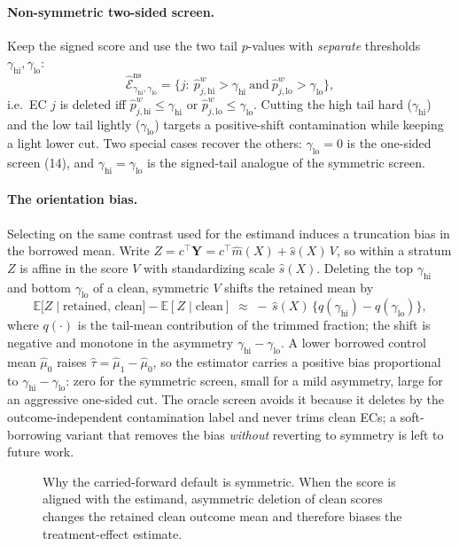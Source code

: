 \documentclass[11pt]{article}
\newcommand{\Exp}{\mathbb{E}}
\newcommand{\fullfig}[1]{\resizebox{\linewidth}{!}{}}
\begin{document}
\paragraph{Non-symmetric two-sided screen.} Keep the signed score and use the two tail $p$-values with \emph{separate} thresholds $\gamma_{\mathrm{hi}},\gamma_{\mathrm{lo}}$:
\[
\widehat{\mathcal E}_{\gamma_{\mathrm{hi}},\gamma_{\mathrm{lo}}}^{\mathrm{ns}}
=
\bigl\{j:\ \widehat p_{j,\mathrm{hi}}^{w}>\gamma_{\mathrm{hi}}\ \text{and}\ \widehat p_{j,\mathrm{lo}}^{w}>\gamma_{\mathrm{lo}}\bigr\},
\]
i.e.\ EC $j$ is deleted iff $\widehat p_{j,\mathrm{hi}}^{w}\le\gamma_{\mathrm{hi}}$ or $\widehat p_{j,\mathrm{lo}}^{w}\le\gamma_{\mathrm{lo}}$. Cutting the high tail hard ($\gamma_{\mathrm{hi}}$) and the low tail lightly ($\gamma_{\mathrm{lo}}$) targets a positive-shift contamination while keeping a light lower cut. Two special cases recover the others: $\gamma_{\mathrm{lo}}{=}0$ is the one-sided screen (14), and $\gamma_{\mathrm{hi}}{=}\gamma_{\mathrm{lo}}$ is the signed-tail analogue of the symmetric screen.

\paragraph{The orientation bias.} Selecting on the same contrast used for the estimand induces a truncation bias in the borrowed mean. Write $Z=c^{\top}\bm Y=c^{\top}\widehat m(X)+\widehat s(X)\,V$, so within a stratum $Z$ is affine in the score $V$ with standardizing scale $\widehat s(X)$. Deleting the top $\gamma_{\mathrm{hi}}$ and bottom $\gamma_{\mathrm{lo}}$ of a clean, symmetric $V$ shifts the retained mean by
\[
\Exp\bigl[Z\mid\text{retained, clean}\bigr]-\Exp[Z\mid\text{clean}]
\;\approx\;-\,\widehat s(X)\,\bigl\{q(\gamma_{\mathrm{hi}})-q(\gamma_{\mathrm{lo}})\bigr\},
\]
where $q(\cdot)$ is the tail-mean contribution of the trimmed fraction; the shift is negative and monotone in the asymmetry $\gamma_{\mathrm{hi}}-\gamma_{\mathrm{lo}}$. A lower borrowed control mean $\widehat\mu_0$ raises $\widehat\tau=\widehat\mu_1-\widehat\mu_0$, so the estimator carries a positive bias proportional to $\gamma_{\mathrm{hi}}-\gamma_{\mathrm{lo}}$: zero for the symmetric screen, small for a mild asymmetry, large for an aggressive one-sided cut. The oracle screen avoids it because it deletes by the outcome-independent contamination label and never trims clean ECs; a soft-borrowing variant that removes the bias \emph{without} reverting to symmetry is left to future work.

\begin{figure}[!ht]
\centering
\fullfig{symmetry_bias.tex}
\caption{Why the carried-forward default is symmetric. When the score is aligned with the estimand, asymmetric deletion of clean scores changes the retained clean outcome mean and therefore biases the treatment-effect estimate.}
\label{fig:symmetry-bias}
\end{figure}
\end{document}
